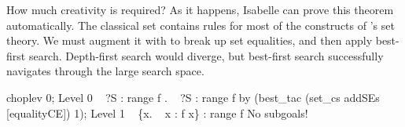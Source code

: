 How much creativity is required?  As it happens, Isabelle can prove this
theorem automatically.  The classical set  contains rules
for most of the constructs of \HOL's set theory.  We must augment it with
 to break up set equalities, and then apply best-first
search.  Depth-first search would diverge, but best-first search
successfully navigates through the large search space.
\begin{ttbox}
choplev 0;
{\out Level 0}
{\out ~ ?S : range f}
{. ~ ?S : range f}
\ttbreak
by (best_tac (set_cs addSEs [equalityCE]) 1);
{\out Level 1}
{\out ~ \{x. ~ x : f x\} : range f}
{\out No subgoals!}
\end{ttbox}

